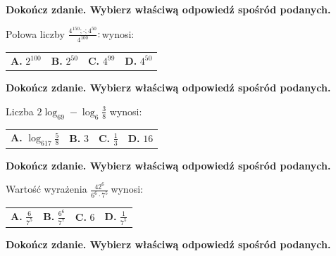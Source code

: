 \documentclass[12pt,a4paper]{article}
\theoremstyle{break}
\begin{document}
	
	\begin{zad}[0-1]
		\textbf{Dokończ zdanie. Wybierz właściwą odpowiedź spośród podanych.}
	\end{zad} 
	
	Połowa liczby \Large$\frac{4^{150};\cdot;4^{50}}{4^{100}}:$\normalsize wynosi:
	
	\vspace{0.5cm}
	\begin{tabular}{p{3.5cm} p{3.5cm} p{3.5cm} p{3.5cm}}
		\textbf{A. }$2^{100}$&
		\textbf{B. }$2^{50}$&
		\textbf{C. }$4^{99}$&
		\textbf{D. }$4^{50}$\\
	\end{tabular}
	
	
	\begin{zad}[0-1]
		\textbf{Dokończ zdanie. Wybierz właściwą odpowiedź spośród podanych.}
	\end{zad} 
	
	Liczba $2\log_69-\log_6\frac{3}{8}$ wynosi:
	
	\vspace{0.5cm}
	\begin{tabular}{p{3.5cm} p{3.5cm} p{3.5cm} p{3.5cm}}
		\textbf{A. }$\log_617\frac{5}{8}$&
		\textbf{B. }$3$&
		\textbf{C. }$\frac{1}{3}$&
		\textbf{D. }$16$\\
	\end{tabular}
	
	
	\begin{zad}[0-1]
		\textbf{Dokończ zdanie. Wybierz właściwą odpowiedź spośród podanych.}
	\end{zad} 
	
	Wartość wyrażenia \large$\frac{42^6}{6^6\cdot7^5}\:$\normalsize wynosi:
	
	\vspace{0.5cm}
	\begin{tabular}{p{3.5cm} p{3.5cm} p{3.5cm} p{3.5cm}}
		\textbf{A. }$\frac{6}{7^5}$&
		\textbf{B. }$\frac{6^6}{7^7}$&
		\textbf{C. }$6$&
		\textbf{D. }$\frac{1}{7^5}$\\
	\end{tabular}

	
	\begin{zad}[0-1]
		\textbf{Dokończ zdanie. Wybierz właściwą odpowiedź spośród podanych.}
	\end{zad} 
	
\end{document}
